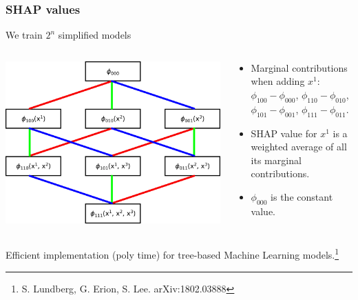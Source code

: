 \documentclass[mathserif, 10pt]{beamer}
\begin{document}
\begin{frame}
    \frametitle{SHAP values}
    We train $2^n$ simplified models

    \begin{columns}
        \begin{column}{0.5\textwidth}
            \includegraphics[width=\columnwidth]{figures/shapgraph.png}
        \end{column}
        \begin{column}{0.5\textwidth}
            \begin{itemize}
                \item Marginal contributions {\color{red} when adding $x^1$}: $\phi_{100}-\phi_{000}$, $\phi_{110}-\phi_{010}$, $\phi_{101}-\phi_{001}$, $\phi_{111} - \phi_{011}$.
                \item SHAP value {\color{red}for $x^1$} is a weighted average of all its marginal contributions.
                \item $\phi_{000}$ is the constant value. 
            \end{itemize}
        \end{column}
    \end{columns}
    
    Efficient implementation (poly time) for tree-based Machine Learning models.\footnote[1]{S. Lundberg, G. Erion, S. Lee. arXiv:1802.03888}

\end{frame}
\end{document}
